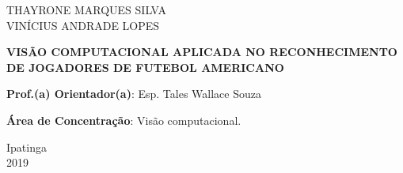 \begin{center}

\large{THAYRONE MARQUES SILVA}\\
\large{VINÍCIUS ANDRADE LOPES}\\

\vspace{2cm}

\textbf{VISÃO COMPUTACIONAL APLICADA NO RECONHECIMENTO DE JOGADORES DE FUTEBOL AMERICANO}

\vspace{6.0cm}


\begin{flushright}
\parbox{8cm}{
}

\vspace{2.0cm}
\textbf{Prof.(a) Orientador(a)}: Esp. Tales Wallace Souza

\textbf{Área de Concentração}: Visão computacional.
\end{flushright}


\par\vfill

Ipatinga\\2019

\end{center}